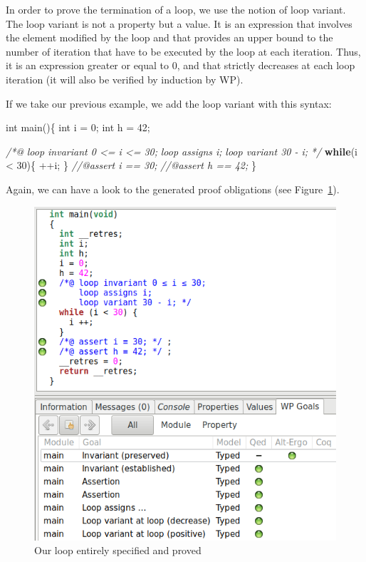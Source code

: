 \documentclass[12pt,francais,]{scrbook}
\newenvironment{Shaded}{}{}
\newcommand{\KeywordTok}[1]{\textcolor[rgb]{0.00,0.44,0.13}{\textbf{{#1}}}}
\newcommand{\DataTypeTok}[1]{\textcolor[rgb]{0.56,0.13,0.00}{{#1}}}
\newcommand{\DecValTok}[1]{\textcolor[rgb]{0.25,0.63,0.44}{{#1}}}
\newcommand{\CommentTok}[1]{\textcolor[rgb]{0.38,0.63,0.69}{\textit{{#1}}}}
\newcommand{\NormalTok}[1]{{#1}}
\begin{document}
In order to prove the termination of a loop, we use the notion of loop
variant. The loop variant is not a property but a value. It is an
expression that involves the element modified by the loop and that
provides an upper bound to the number of iteration that have to be
executed by the loop at each iteration. Thus, it is an expression
greater or equal to 0, and that strictly decreases at each loop
iteration (it will also be verified by induction by WP).

\clearpage
If we take our previous example, we add the loop variant with this
syntax:

\begin{footnotesize}\begin{Shaded}
\begin{Highlighting}[]
\DataTypeTok{int} \NormalTok{main()\{}
  \DataTypeTok{int} \NormalTok{i = }\DecValTok{0}\NormalTok{;}
  \DataTypeTok{int} \NormalTok{h = }\DecValTok{42}\NormalTok{;}
  
  \CommentTok{/*@}
\CommentTok{    loop invariant 0 <= i <= 30;}
\CommentTok{    loop assigns i;}
\CommentTok{    loop variant 30 - i;}
\CommentTok{  */}
  \KeywordTok{while}\NormalTok{(i < }\DecValTok{30}\NormalTok{)\{}
    \NormalTok{++i;}
  \NormalTok{\}}
  \CommentTok{//@assert i == 30;}
  \CommentTok{//@assert h == 42;}
\NormalTok{\}}
\end{Highlighting}
\end{Shaded}\end{footnotesize}

Again, we can have a look to the generated proof obligations
(see Figure~\ref{fig:3-3-loop-ok}).

\begin{figure}[htbp]
\centering
\includegraphics[scale=0.5]{3-3-boucle_complete.png}
\caption{Our loop entirely specified and proved}
\label{fig:3-3-loop-ok}
\end{figure}
\end{document}
